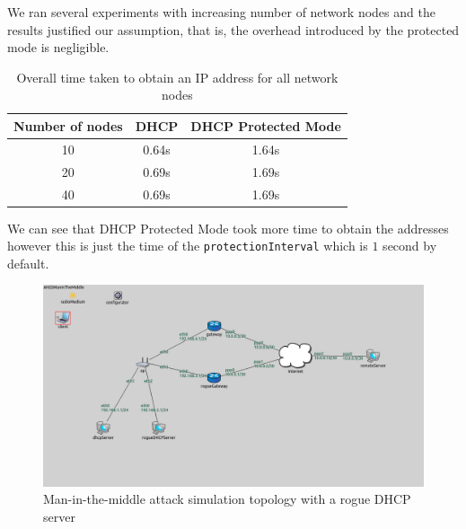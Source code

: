 \documentclass[letterpaper, 10 pt, conference]{ieeeconf}  %
\begin{document}
We ran several experiments with increasing number of network nodes and the results justified our assumption, that is, the overhead introduced by the protected mode is negligible.
\begin{table}[h]
\begin{center}
\begin{tabular}{ |c|c|c| } 
 \hline
 Number of nodes & DHCP & DHCP Protected Mode \\ 
 \hline
 10 & 0.64s & 1.64s \\ 
 \hline
 20 & 0.69s & 1.69s \\ 
 \hline
 40 & 0.69s & 1.69s \\ 
 \hline
\end{tabular}
\end{center}
\caption{Overall time taken to obtain an IP address for all network nodes}
\end{table}
We can see that DHCP Protected Mode took more time to obtain the addresses however this is just the time of the \texttt{protectionInterval} which is $1$ second by default.
\addtolength{\textheight}{-12cm}   %




\begin{figure}
\centering
\includegraphics[scale=0.4]{figures/topology.png}
\caption{Man-in-the-middle attack simulation topology with a rogue DHCP server}\label{fig:topology}
\end{figure}
\end{document}
